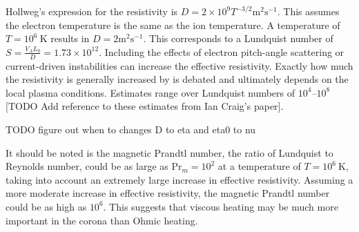 Hollweg's expression for the resistivity is $D = 2 \times 10^{9} T^{-3/2} \text{m}^2 \text{s}^{-1}$. This assumes the electron temperature is the same as the ion temperature. A temperature of $T=10^6\ \text{K}$ results in $D = 2 \text{m}^2 \text{s}^{-1}$. This corresponds to a Lundquist number of $S = \frac{V_A L_0}{D} = 1.73 \times 10^{12}$. Including the effects of electron pitch-angle scattering or current-driven instabilities can increase the effective resistivity. Exactly how much the resistivity is generally increased by is debated and ultimately depends on the local plasma conditions. Estimates range over Lundquist numbers of $10^{4}$--$10^{8}$ [TODO Add reference to these estimates from Ian Craig's paper].

TODO figure out when to changes D to eta and eta0 to nu

It should be noted is the magnetic Prandtl number, the ratio of Lundquist to Reynolds number, could be as large as $\text{Pr}_m = 10^2$ at a temperature of $T=10^6\ \text{K}$, taking into account an extremely large increase in effective resistivity. Assuming a more moderate increase in effective resistivity, the magnetic Prandtl number could be as high as $10^{6}$. This suggests that viscous heating may be much more important in the corona than Ohmic heating.
